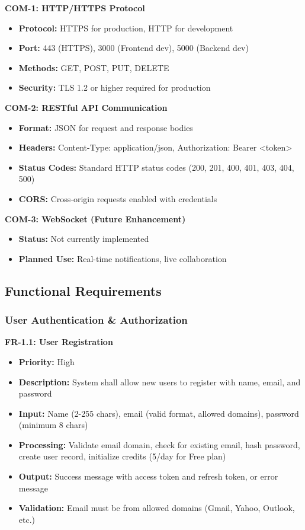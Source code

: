 \documentclass[12pt,a4paper]{article}
\begin{document}
\textbf{COM-1: HTTP/HTTPS Protocol}
\begin{itemize}
    \item \textbf{Protocol:} HTTPS for production, HTTP for development
    \item \textbf{Port:} 443 (HTTPS), 3000 (Frontend dev), 5000 (Backend dev)
    \item \textbf{Methods:} GET, POST, PUT, DELETE
    \item \textbf{Security:} TLS 1.2 or higher required for production
\end{itemize}

\textbf{COM-2: RESTful API Communication}
\begin{itemize}
    \item \textbf{Format:} JSON for request and response bodies
    \item \textbf{Headers:} Content-Type: application/json, Authorization: Bearer <token>
    \item \textbf{Status Codes:} Standard HTTP status codes (200, 201, 400, 401, 403, 404, 500)
    \item \textbf{CORS:} Cross-origin requests enabled with credentials
\end{itemize}

\textbf{COM-3: WebSocket (Future Enhancement)}
\begin{itemize}
    \item \textbf{Status:} Not currently implemented
    \item \textbf{Planned Use:} Real-time notifications, live collaboration
\end{itemize}

\subsection{Functional Requirements}

\subsubsection{User Authentication \& Authorization}

\textbf{FR-1.1: User Registration}
\begin{itemize}
    \item \textbf{Priority:} High
    \item \textbf{Description:} System shall allow new users to register with name, email, and password
    \item \textbf{Input:} Name (2-255 chars), email (valid format, allowed domains), password (minimum 8 chars)
    \item \textbf{Processing:} Validate email domain, check for existing email, hash password, create user record, initialize credits (5/day for Free plan)
    \item \textbf{Output:} Success message with access token and refresh token, or error message
    \item \textbf{Validation:} Email must be from allowed domains (Gmail, Yahoo, Outlook, etc.)
\end{itemize}
\end{document}
